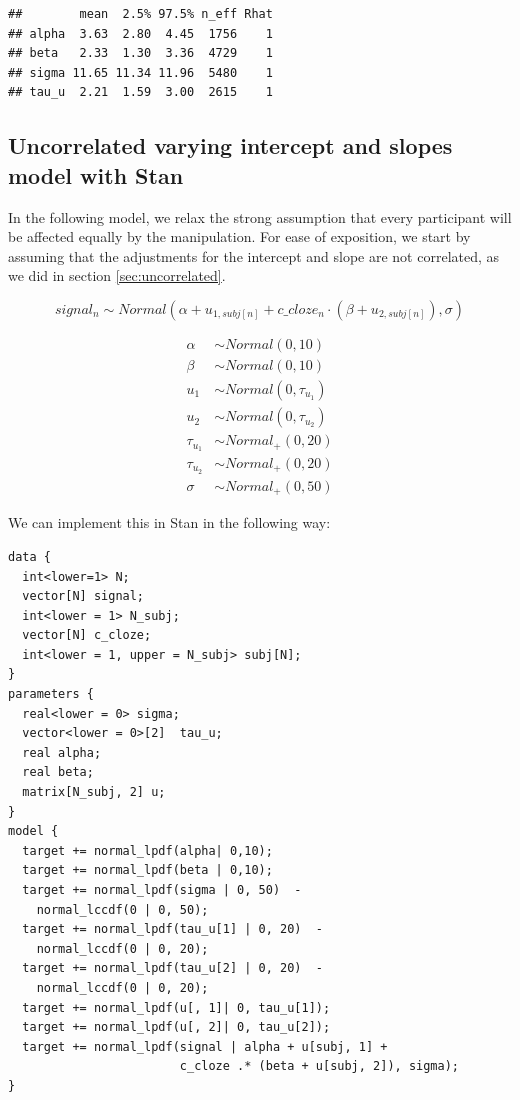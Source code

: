 \documentclass[12pt,]{krantz}
\theoremstyle{definition}
\theoremstyle{definition}
\theoremstyle{definition}
\theoremstyle{remark}
\begin{document}
\begin{verbatim}
##        mean  2.5% 97.5% n_eff Rhat
## alpha  3.63  2.80  4.45  1756    1
## beta   2.33  1.30  3.36  4729    1
## sigma 11.65 11.34 11.96  5480    1
## tau_u  2.21  1.59  3.00  2615    1
\end{verbatim}

\hypertarget{sec:uncorrstan}{%
\subsection{Uncorrelated varying intercept and slopes model with Stan}\label{sec:uncorrstan}}

In the following model, we relax the strong assumption that every participant will be affected equally by the manipulation. For ease of exposition, we start by assuming that the adjustments for the intercept and slope are not correlated, as we did in section \ref{sec:uncorrelated}.

\begin{equation}
  signal_n \sim Normal(\alpha + u_{1,subj[n]} + c\_cloze_n \cdot (\beta+ u_{2,subj[n]}),\sigma)
\end{equation}

\begin{equation}
 \begin{aligned}
 \alpha &\sim Normal(0,10)\\
 \beta  &\sim Normal(0,10)\\
 u_1 &\sim Normal(0,\tau_{u_1})\\
 u_2 &\sim Normal(0,\tau_{u_2})\\
 \tau_{u_1} &\sim Normal_+(0,20) \\
 \tau_{u_2} &\sim Normal_+(0,20) \\
 \sigma  &\sim Normal_+(0,50)
 \end{aligned}
 \end{equation}

We can implement this in Stan in the following way:

\begin{verbatim}
data {
  int<lower=1> N;
  vector[N] signal;
  int<lower = 1> N_subj;
  vector[N] c_cloze;
  int<lower = 1, upper = N_subj> subj[N]; 
}
parameters {
  real<lower = 0> sigma;
  vector<lower = 0>[2]  tau_u;   
  real alpha;
  real beta;
  matrix[N_subj, 2] u;
}
model {
  target += normal_lpdf(alpha| 0,10);
  target += normal_lpdf(beta | 0,10);
  target += normal_lpdf(sigma | 0, 50)  -
    normal_lccdf(0 | 0, 50);
  target += normal_lpdf(tau_u[1] | 0, 20)  - 
    normal_lccdf(0 | 0, 20);
  target += normal_lpdf(tau_u[2] | 0, 20)  - 
    normal_lccdf(0 | 0, 20);
  target += normal_lpdf(u[, 1]| 0, tau_u[1]);
  target += normal_lpdf(u[, 2]| 0, tau_u[2]);
  target += normal_lpdf(signal | alpha + u[subj, 1] +
                        c_cloze .* (beta + u[subj, 2]), sigma);
}
\end{verbatim}
\end{document}
